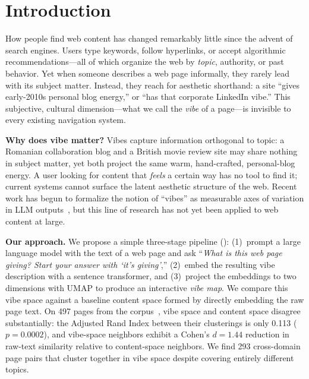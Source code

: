 \section{Introduction}
\label{sec:intro}

How people find web content has changed remarkably little since the advent of search engines.
Users type keywords, follow hyperlinks, or accept algorithmic recommendations---all of which organize the web by \emph{topic}, authority, or past behavior.
Yet when someone describes a web page informally, they rarely lead with its subject matter.
Instead, they reach for aesthetic shorthand: a site ``gives early-2010s personal blog energy,'' or ``has that corporate LinkedIn vibe.''
This subjective, cultural dimension---what we call the \emph{vibe} of a page---is invisible to every existing navigation system.

{\bf Why does vibe matter?}
Vibes capture information orthogonal to topic: a Romanian collaboration blog and a British movie review site may share nothing in subject matter, yet both project the same warm, hand-crafted, personal-blog energy.
A user looking for content that \emph{feels} a certain way has no tool to find it; current systems cannot surface the latent aesthetic structure of the web.
Recent work has begun to formalize the notion of ``vibes'' as measurable axes of variation in LLM outputs~\cite{dunlap2024vibecheck}, but this line of research has not yet been applied to web content at large.

{\bf Our approach.}
We propose a simple three-stage pipeline (): (1)~prompt a large language model with the text of a web page and ask ``\emph{What is this web page giving? Start your answer with `it's giving'},'' (2)~embed the resulting vibe description with a sentence transformer, and (3)~project the embeddings to two dimensions with UMAP to produce an interactive \emph{vibe map}.
We compare this vibe space against a baseline content space formed by directly embedding the raw page text.
On 497 pages from the \cfour corpus~\cite{raffel2020exploring}, vibe space and content space disagree substantially: the Adjusted Rand Index between their clusterings is only 0.113 ($p{=}0.0002$), and vibe-space neighbors exhibit a Cohen's $d{=}1.44$ reduction in raw-text similarity relative to content-space neighbors.
We find 293 cross-domain page pairs that cluster together in vibe space despite covering entirely different topics.

